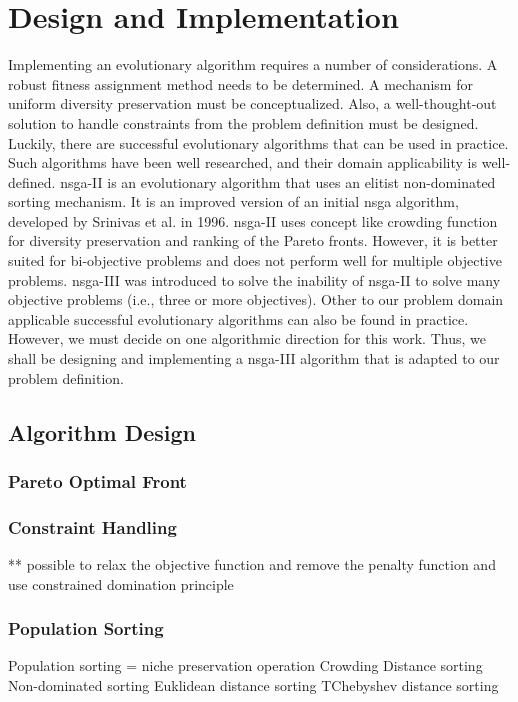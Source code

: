 \chapter{Design and Implementation}\label{chapter:prototype_implementation}
Implementing an evolutionary algorithm requires a number of considerations. A robust fitness assignment method needs to be determined. A mechanism for uniform diversity preservation must be conceptualized. Also, a well-thought-out solution to handle constraints from the problem definition must be designed. Luckily, there are successful evolutionary algorithms that can be used in practice. Such algorithms have been well researched, and their domain applicability is well-defined. \Gls{nsga}-II \parencite{Jain2013AnOptimization} is an evolutionary algorithm that uses an elitist non-dominated sorting mechanism. It is an improved version of an initial \gls{nsga} algorithm, developed by  Srinivas et al. \parencite{Srinivas1994MuiltiobjectiveAlgorithms} in 1996. 
\Gls{nsga}-II uses concept like crowding function for diversity preservation and ranking of the Pareto fronts. However, it is better suited for bi-objective problems and does not perform well for multiple objective problems. \Gls{nsga}-III \parencite{Mkaouer2015Many-objectiveNSGA-III} was introduced to solve the inability of \gls{nsga}-II to solve many objective problems (i.e., three or more objectives). Other to our problem domain applicable successful evolutionary algorithms can also be found in practice. However, we must decide on one algorithmic direction for this work. Thus, we shall be designing and implementing a \gls{nsga}-III algorithm that is adapted to our problem definition.

\section{Algorithm Design}

\subsection{Pareto Optimal Front}

\subsection{Constraint Handling}
** possible to relax the objective function and remove the penalty function and use constrained domination principle

\subsection{Population Sorting}
Population sorting = niche preservation operation
\-Crowding Distance sorting
\-Non-dominated sorting 
\-Euklidean distance sorting
\-TChebyshev distance sorting

